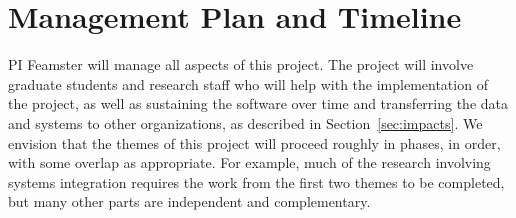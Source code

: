 \section{Management Plan and Timeline}\label{sec:management}

PI Feamster will manage all aspects of this project. The project will involve
graduate students and research staff who will help with the implementation of
the project, as well as sustaining the software over time and transferring the
data and systems to other organizations, as described in
Section~\ref{sec:impacts}. We envision that the themes of this project will
proceed roughly in phases, in order, with some overlap as appropriate. For
example, much of the research involving systems integration requires the work
from the first two themes to be completed, but many other parts are
independent and complementary. 

